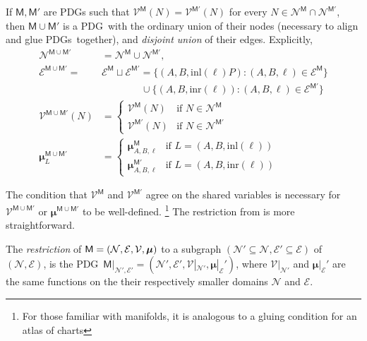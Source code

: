 \documentclass{article}
\newcommand{\notation}[2][]{#1}
\renewcommand{\notation}[2][]{{\color{notationcolor} #2}}
\newcommand{\vfullfootnote}[1]{}
\renewcommand{\vfullfootnote}[1]{\footnote{#1}}
\newcommand{\bmu}{\boldsymbol{\mu}}
\newcommand{\V}{\mathcal V}
\newcommand{\N}{\mathcal N}
\newcommand{\Ed}{\mathcal E}
\newcommand{\sfM}{\mathsf M}
\newcommand{\MN}{PDG}
\newcommand{\MNs}{\MN s}
\numberwithin{equation}{section}
\begin{document}
	\begin{defn}[union] \label{def:model-union}
		If $\sfM, \sfM'$ are \MN s such that $\V^\sfM(N) = \V^{\sfM'}(N)$ for every $N \in  \N^{\sfM} \cap \N^{\sfM'}$, then $\sfM \cup \sfM'$ is a \MN\ with the ordinary union of their nodes (necessary to align and glue \MNs\ together), and \emph{disjoint union} of their edges. \notation{Explicitly,
		\begin{align*}
			\N^{\sfM \cup \sfM'} &= \N^\sfM \cup \N^{\sfM'},  \\
			\Ed^{\sfM \cup \sfM'} \!=& \Ed^\sfM \sqcup \Ed^{\sfM'}\!
				=  \{ (A, B, \text{inl}(\ell)P) : (A,B,\ell)\in \Ed^\sfM \}  \\
					&\qquad\qquad \cup \{ (A, B, \text{inr}(\ell)) : (A,B,\ell)\in \Ed^{\sfM'} \} \\ 
			\V^{\sfM \cup \sfM'} (N) &= \begin{cases}
					\V^{\sfM}(N) & \text{if }N \in \N^\sfM \\
					\V^{\sfM'}(N) &\text{if }N \in \N^{\sfM'} 
				\end{cases}\\
			\bmu^{\sfM \cup \sfM'}_L &= \begin{cases}
				\bmu^{\sfM}_{A, B, \ell} &\text{if } L = (A, B, \text{inl} (\ell)) \\
				\bmu^{\sfM'}_{A, B, \ell} &\text{if } L = (A, B, \text{inr} (\ell)) 
			\end{cases}
		\end{align*}}
	\end{defn}
	The condition that $\V^\sfM$ and $\V^{\sfM'}$ agree on the shared variables is necessary for $\V^{\sfM\cup \sfM'}$ or $\bmu^{\sfM \cup \sfM'}$ to be well-defined.%
		\vfullfootnote{For those familiar with manifolds, it is analogous to a gluing condition for an atlas of charts}
	The restriction from  is more straightforward.%
	
	\begin{defn}[restriction]\label{def:restriction}
		The \emph{restriction} of $\sfM = \mnvars[]$ to a subgraph $(\N' \subseteq \N, \Ed' \subseteq \Ed)$ of $(\N, \Ed)$, is the \MN\, $\sfM|_{\N', \Ed'} = (\N', \Ed', \V |_{\N'}, \bmu|_\Ed')$, where 
		$\V|_{\N'}$ and $\bmu|_\Ed'$ are the same functions on the their respectively smaller domains $\N$ and $\Ed$. 
	\end{defn}
	
\end{document}
